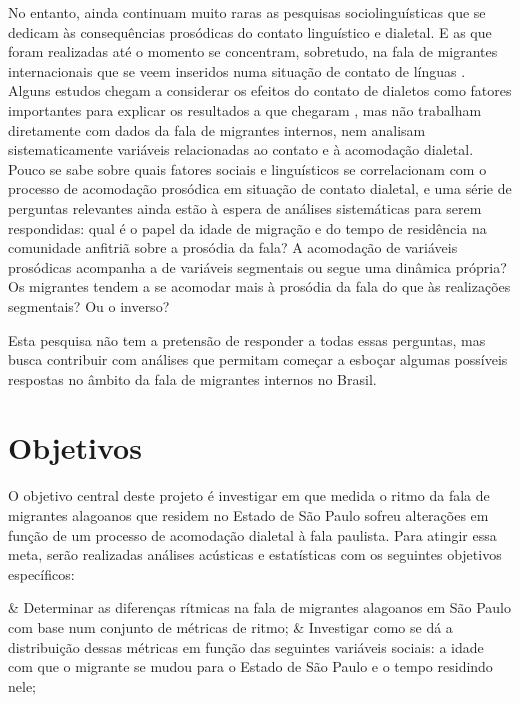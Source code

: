 \documentclass[
		a4paper,	%
		12pt,		%
		]{article}	%
\begin{document}
	No entanto, ainda continuam muito raras as pesquisas sociolinguísticas que
	se dedicam às consequências prosódicas do contato linguístico e dialetal. E
	as que foram realizadas até o momento se concentram, sobretudo, na fala de
	migrantes internacionais que se veem inseridos numa situação de contato de
	línguas \citep{Carter2005}. Alguns estudos chegam a considerar os efeitos do
	contato de dialetos como fatores importantes para explicar os resultados a que
	chegaram \citep{Torgersen.Szakay2012, Fagyal2010}, mas não trabalham
	diretamente com dados da fala de migrantes internos, nem analisam
	sistematicamente variáveis relacionadas ao contato e à acomodação dialetal.
	Pouco se sabe sobre quais fatores sociais e linguísticos se correlacionam
	com o processo de acomodação prosódica em situação de contato dialetal, e
	uma série de perguntas relevantes ainda estão à espera de análises
	sistemáticas para serem respondidas: qual é o papel da idade de migração e
	do tempo de residência na comunidade anfitriã sobre a prosódia da fala? A
	acomodação de variáveis prosódicas acompanha a de variáveis segmentais ou
	segue uma dinâmica própria? Os migrantes tendem a se acomodar mais à
	prosódia da fala do que às realizações segmentais? Ou o inverso? 
		
	Esta pesquisa não tem a pretensão de responder a todas essas perguntas, mas
	busca contribuir com análises que permitam começar a esboçar algumas
	possíveis respostas no âmbito da fala de migrantes internos no Brasil.

	\section{Objetivos} \label{objetivos}

	O objetivo central deste projeto é investigar em que medida o ritmo da fala
	de migrantes alagoanos que residem no Estado de São Paulo sofreu alterações
	em função de um processo de acomodação dialetal à fala paulista. Para
	atingir essa meta, serão realizadas análises acústicas e estatísticas com os
	seguintes objetivos específicos:

	\begin{easylist}[enumerate]
		& Determinar as diferenças rítmicas na fala de migrantes alagoanos em
		São Paulo com base num conjunto de métricas de ritmo;
		& Investigar como se dá a distribuição dessas métricas em função das
		seguintes variáveis sociais: a idade com que o migrante se mudou para o
		Estado de São Paulo e o tempo residindo nele;
	\end{easylist}
\end{document}

